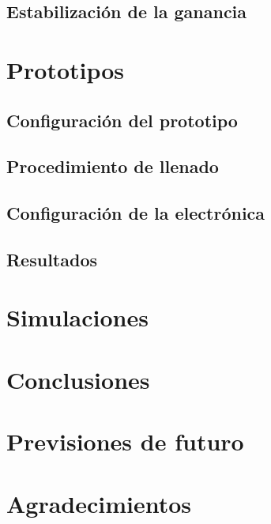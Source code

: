 \documentclass[11pt,a4paper]{article}
\begin{document}
	\subsection{Estabilización de la ganancia}\label{sec:Compensacion}
	

\newpage
\section{Prototipos} \label{sec:Prototipo}

	\subsection{Configuración del prototipo}\label{sec:Configuracion}
	
	
	\subsection{Procedimiento de llenado}\label{sec:Llenado}
	
	
	\subsection{Configuración de la electrónica}\label{sec:Electronica}
	
	
	\subsection{Resultados}\label{sec:Resultados}
	

\newpage
\section{Simulaciones} \label{sec:Simulaciones}


\newpage
\section{Conclusiones} \label{sec:Conclusiones}


\newpage
\section{Previsiones de futuro} \label{sec:Futuro}


\section*{Agradecimientos} \label{sec:Agradecimientos}



\end{document}
